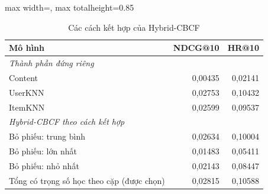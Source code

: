 \begin{table}[H]
    \centering\small
    \caption{Các cách kết hợp của Hybrid-CBCF}
    \label{tab:v2hybrid}
    \begin{adjustbox}{max width=\textwidth, max totalheight=0.85\textheight}
    \begin{tabular}{|l|r|r|}
        \hline
        Mô hình & NDCG@10 & HR@10 \\ \hline
        \multicolumn{3}{|l|}{\textit{Thành phần đứng riêng}} \\ \hline
        Content & 0{,}00435 & 0{,}02141 \\ \hline
        UserKNN & 0{,}02753 & 0{,}10432 \\ \hline
        ItemKNN & 0{,}02599 & 0{,}09537 \\ \hline
        \multicolumn{3}{|l|}{\textit{Hybrid-CBCF theo cách kết hợp}} \\ \hline
        Bỏ phiếu: trung bình & 0{,}02634 & 0{,}10004 \\ \hline
        Bỏ phiếu: lớn nhất & 0{,}01483 & 0{,}05411 \\ \hline
        Bỏ phiếu: nhỏ nhất & 0{,}02143 & 0{,}08447 \\ \hline
        Tổng có trọng số học theo cặp (được chọn) & 0{,}02815 & 0{,}10588 \\ \hline
    \end{tabular}
    \end{adjustbox}
\end{table}
